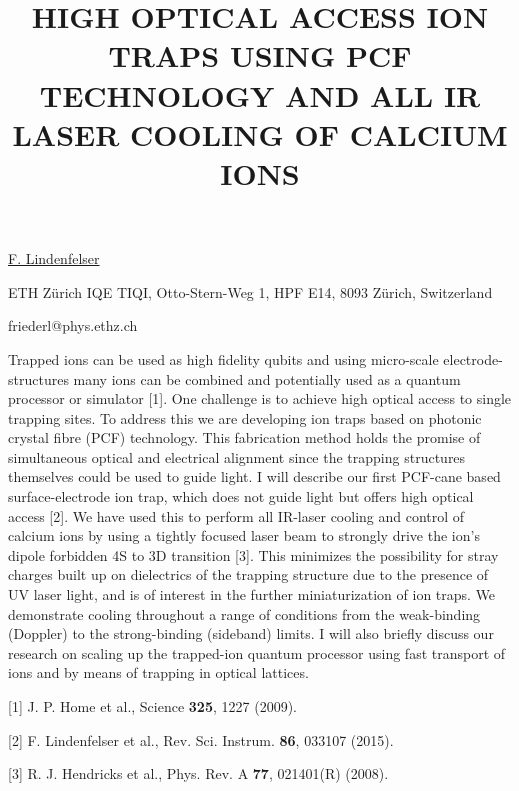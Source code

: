 \title{HIGH OPTICAL ACCESS ION TRAPS USING PCF TECHNOLOGY AND ALL IR LASER COOLING OF CALCIUM IONS}

\underline{F. Lindenfelser} 

{\normalsize{\vspace{-4mm}
ETH Z\"{u}rich IQE TIQI,
Otto-Stern-Weg 1, HPF E14,
8093 Z\"{u}rich, Switzerland

\email friederl@phys.ethz.ch}}

Trapped ions can be used as high fidelity qubits and using micro-scale electrode-structures many ions can be combined and potentially used as a quantum processor or simulator [1]. One challenge is to achieve high optical access to single trapping sites. To address this we are developing ion traps based on photonic crystal fibre (PCF) technology. This fabrication method holds the promise of simultaneous optical and electrical alignment since the trapping structures themselves could be used to guide light. I will describe our first PCF-cane based surface-electrode ion trap, which does not guide light but offers high optical access [2]. We have used this to perform all IR-laser cooling and control of calcium ions by using a tightly focused laser beam to strongly drive the ion's dipole forbidden 4S to 3D transition [3].
This minimizes the possibility for stray charges built up on dielectrics of the trapping structure due to the presence of UV laser light, and is of interest in the further miniaturization of ion traps. We demonstrate cooling throughout a range of conditions from the weak-binding (Doppler) to the strong-binding (sideband) limits. I will also briefly discuss our research on scaling up the trapped-ion quantum processor using fast transport of ions and by means of trapping in optical lattices.

{\normalsize
[1] J. P. Home et al., Science \textbf{325}, 1227 (2009).
\vsp

[2] F. Lindenfelser et al., Rev. Sci. Instrum. \textbf{86}, 033107 (2015).
\vsp

[3] R. J. Hendricks et al., Phys. Rev. A \textbf{77}, 021401(R) (2008).
}



\vspace{\baselineskip} 